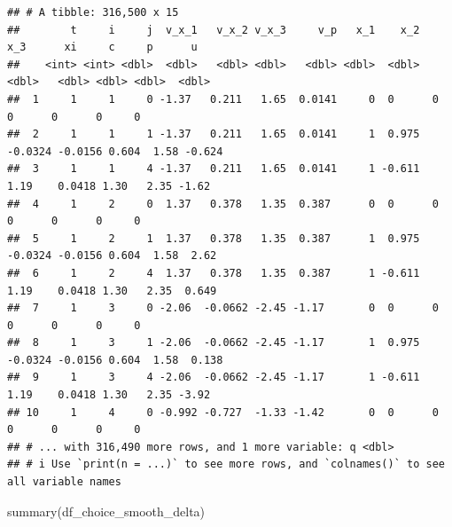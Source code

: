\documentclass[
]{book}
\newenvironment{Shaded}{\begin{snugshade}}{\end{snugshade}}
\newcommand{\FunctionTok}[1]{\textcolor[rgb]{0.00,0.00,0.00}{#1}}
\newcommand{\NormalTok}[1]{#1}
\begin{document}
\begin{verbatim}
## # A tibble: 316,500 x 15
##        t     i     j  v_x_1   v_x_2 v_x_3     v_p   x_1    x_2     x_3      xi     c     p      u
##    <int> <int> <dbl>  <dbl>   <dbl> <dbl>   <dbl> <dbl>  <dbl>   <dbl>   <dbl> <dbl> <dbl>  <dbl>
##  1     1     1     0 -1.37   0.211   1.65  0.0141     0  0      0       0      0      0     0    
##  2     1     1     1 -1.37   0.211   1.65  0.0141     1  0.975 -0.0324 -0.0156 0.604  1.58 -0.624
##  3     1     1     4 -1.37   0.211   1.65  0.0141     1 -0.611  1.19    0.0418 1.30   2.35 -1.62 
##  4     1     2     0  1.37   0.378   1.35  0.387      0  0      0       0      0      0     0    
##  5     1     2     1  1.37   0.378   1.35  0.387      1  0.975 -0.0324 -0.0156 0.604  1.58  2.62 
##  6     1     2     4  1.37   0.378   1.35  0.387      1 -0.611  1.19    0.0418 1.30   2.35  0.649
##  7     1     3     0 -2.06  -0.0662 -2.45 -1.17       0  0      0       0      0      0     0    
##  8     1     3     1 -2.06  -0.0662 -2.45 -1.17       1  0.975 -0.0324 -0.0156 0.604  1.58  0.138
##  9     1     3     4 -2.06  -0.0662 -2.45 -1.17       1 -0.611  1.19    0.0418 1.30   2.35 -3.92 
## 10     1     4     0 -0.992 -0.727  -1.33 -1.42       0  0      0       0      0      0     0    
## # ... with 316,490 more rows, and 1 more variable: q <dbl>
## # i Use `print(n = ...)` to see more rows, and `colnames()` to see all variable names
\end{verbatim}

\begin{Shaded}
\begin{Highlighting}[]
\FunctionTok{summary}\NormalTok{(df\_choice\_smooth\_delta)}
\end{Highlighting}
\end{Shaded}
\end{document}
